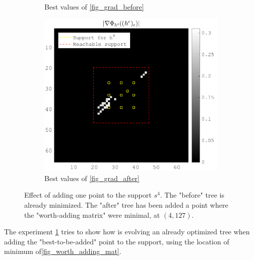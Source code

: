 \begin{figure}[!h]
\begin{subfigure}[b]{0.32\textwidth}
\caption{Best values of \ref{fig_grad_before}}
\end{subfigure}
\begin{subfigure}[b]{0.32\textwidth}\centering
\includegraphics[width=\textwidth]{figures/before_after/xp_128x128_sc2_angl1_K3_S3_node4after_partgrad4_bestvalues.png}
\caption{Best values of \ref{fig_grad_after}}
\end{subfigure}
\caption{Effect of adding one point to the support $s^4$. The "before" tree is already minimized. The "after" tree has been added a point where the "worth-adding matrix" were minimal, at $(4,127)$.} \label{fig_before_after_adding}
\end{figure}

The experiment \ref{fig_before_after_adding} tries to show how is evolving an already optimized tree when adding the "best-to-be-added" point to the support, using the location of minimum of\ref{fig_worth_adding_mat}.



